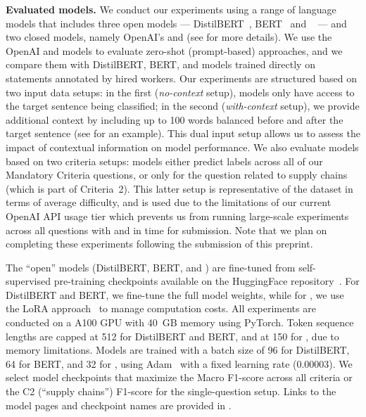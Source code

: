 \textbf{Evaluated models.} We conduct our experiments using a range of language models that includes three open models --- DistilBERT~\cite{sanh2020distilbert}, BERT~\cite{devlin2019bert} and \llama{}~\cite{touvron2023llama} --- and two closed models, namely OpenAI's \gptthree{} and \gptfour{} (see \appendixImplDetails{} for more details). We use the OpenAI and \llama{} models to evaluate zero-shot (prompt-based) approaches, and we compare them with DistilBERT, BERT, and \llama{} models trained directly on statements annotated by hired workers. Our experiments are structured based on two input data setups: in the first (\emph{no-context} setup), models only have access to the target sentence being classified; in the second (\emph{with-context} setup), we provide additional context by including up to 100 words balanced before and after the target sentence (see \appendixPromptDesign{} for an example). This dual input setup allows us to assess the impact of contextual information on model performance. We also evaluate models based on two criteria setups: models either predict labels across all of our Mandatory Criteria questions, or only for the question related to supply chains (which is part of Criteria~2). This latter setup is representative of the dataset in terms of average difficulty, and is used due to the limitations of our current OpenAI API usage tier which prevents us from running large-scale experiments across all questions with \gptthree{} and \gptfour{} in time for submission. Note that we plan on completing these experiments following the submission of this preprint.

The ``open'' models (DistilBERT, BERT, and \llama{}) are fine-tuned from self-supervised pre-training checkpoints available on the HuggingFace repository~\cite{wolf2019huggingface}. For DistilBERT and BERT, we fine-tune the full model weights, while for \llama{}, we use the LoRA approach~\cite{hu2021lora} to manage computation costs. All experiments are conducted on a A100 GPU with 40~GB memory using PyTorch. Token sequence lengths are capped at 512 for DistilBERT and BERT, and at 150 for \llama{}, due to memory limitations. Models are trained with a batch size of 96 for DistilBERT, 64 for BERT, and 32 for \llama{}, using Adam~\cite{kingma2014adam} with a fixed learning rate (0.00003). We select model checkpoints that maximize the Macro F1-score across all criteria or the C2 (``supply chains'') F1-score for the single-question setup. Links to the model pages and checkpoint names are provided in \appendixImplDetails{}.

